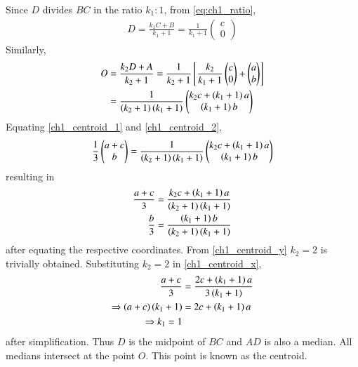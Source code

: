 Since $D$ divides $BC$ in the ratio $k_1:1$, from \eqref{eq:ch1_ratio},
%
\begin{align}
D = \frac{k_1C+B}{k_1+1}=\frac{1}{k_1+1}
\begin{pmatrix}
c
\\
0
\end{pmatrix}
\end{align}
%
Similarly, 
%
\begin{align}
O &= \frac{k_2D+A}{k_2+1} 
= \frac{1}{k_2+1}{}\left[
\frac{k_2}{k_1+1}
\begin{pmatrix}
c
\\
0
\end{pmatrix}
+
\begin{pmatrix}
a
\\
b
\end{pmatrix}
\right]
\\
&=
\frac{1}{\left(k_2+1\right)\left(k_1+1\right)}
\begin{pmatrix}
k_2c + \left(k_1+1\right)a
\\
\left(k_1+1\right)b
\end{pmatrix}
\label{ch1_centroid_2}
\end{align}
%
Equating \eqref{ch1_centroid_1} and \eqref{ch1_centroid_2},
\begin{equation}
\frac{1}{3}
\begin{pmatrix}
a+c
\\
b
\end{pmatrix}
=
\frac{1}{\left(k_2+1\right)\left(k_1+1\right)}
\begin{pmatrix}
k_2c + \left(k_1+1\right)a
\\
\left(k_1+1\right)b
\end{pmatrix}
\end{equation}
resulting in 
\begin{align}
\label{ch1_centroid_x}
\frac{a+c}{3}&=
\frac{k_2c + \left(k_1+1\right)a}{\left(k_2+1\right)\left(k_1+1\right)}
\\
\frac{b}{3}&=
\frac{\left(k_1+1\right)b}{\left(k_2+1\right)\left(k_1+1\right)}
\label{ch1_centroid_y}
\end{align}
after equating the respective coordinates. From \eqref{ch1_centroid_y} $k_2=2$ is trivially obtained.  Substituting $k_2 = 2$ in \eqref{ch1_centroid_x},
\begin{align}
\frac{a+c}{3}&=
\frac{2c + \left(k_1+1\right)a}{3\left(k_1+1\right)}
\\
\Rightarrow \left(a+c\right)\left(k_1+1\right)&=
2c + \left(k_1+1\right)a
\\
\Rightarrow k_1=1
\end{align}
after simplification.  Thus $D$ is the midpoint of $BC$ and $AD$ is also a median.  All medians intersect at the point $O$.  This point is known as the centroid.